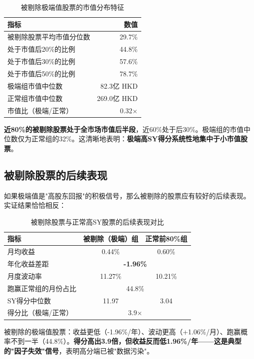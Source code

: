 \documentclass[10pt,a4paper]{ctexart}
\begin{document}
\begin{table}[htbp]
\centering
\caption{被剔除极端值股票的市值分布特征}
\begin{tabular}{lr}
\toprule
\textbf{指标} & \textbf{数值} \\
\midrule
被剔除股票平均市值分位数 & 29.7\% \\
处于市值后20\%的比例 & 44.8\% \\
处于市值后30\%的比例 & 57.6\% \\
处于市值后50\%的比例 & 78.7\% \\
极端组市值中位数 & 82.3亿 HKD \\
正常组市值中位数 & 269.0亿 HKD \\
市值比（极端/正常） & 0.32$\times$ \\
\bottomrule
\end{tabular}
\end{table}

\textbf{近80\%的被剔除股票处于全市场市值后半段}，近60\%处于后30\%。极端组的市值中位数仅为正常组的32\%。这清晰地表明：\textbf{极端高SY得分系统性地集中于小市值股票}。

\subsection{被剔除股票的后续表现}

如果极端值是"高股东回报"的积极信号，那么被剔除的股票应有较好的后续表现。实证结果恰恰相反：

\begin{table}[htbp]
\centering
\caption{被剔除股票与正常高SY股票的后续表现对比}
\begin{tabular}{lcc}
\toprule
\textbf{指标} & \textbf{被剔除（极端）组} & \textbf{正常前80\%组} \\
\midrule
月均收益 & 0.44\% & 0.60\% \\
年化收益差距 & \multicolumn{2}{c}{\textbf{-1.96\%}} \\
月度波动率 & 11.27\% & 10.21\% \\
跑赢正常组的月份占比 & \multicolumn{2}{c}{44.8\%} \\
SY得分中位数 & 11.97 & 3.04 \\
得分比（极端/正常） & \multicolumn{2}{c}{3.9$\times$} \\
\bottomrule
\end{tabular}
\end{table}

被剔除的极端值股票：收益更低（-1.96\%/年）、波动更高（+1.06\%/月）、跑赢概率不到一半（44.8\%）。\textbf{得分高出3.9倍，但收益反而低1.96\%/年——这是典型的"因子失效"信号}，表明高分端已被"数据污染"。
\end{document}

